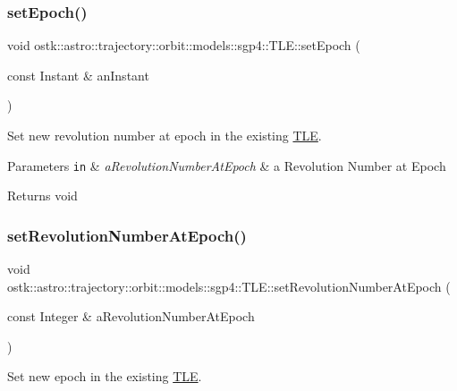 \subsubsection{\texorpdfstring{set\+Epoch()}{setEpoch()}}
{\footnotesize\ttfamily void ostk\+::astro\+::trajectory\+::orbit\+::models\+::sgp4\+::\+T\+L\+E\+::set\+Epoch (\begin{DoxyParamCaption}\item[{const Instant \&}]{an\+Instant }\end{DoxyParamCaption})}



Set new revolution number at epoch in the existing \hyperlink{classostk_1_1astro_1_1trajectory_1_1orbit_1_1models_1_1sgp4_1_1_t_l_e}{T\+LE}. 


\begin{DoxyParams}[1]{Parameters}
\mbox{\tt in}  & {\em a\+Revolution\+Number\+At\+Epoch} & a Revolution Number at Epoch \\
\hline
\end{DoxyParams}
\begin{DoxyReturn}{Returns}
void 
\end{DoxyReturn}
\mbox{\label{classostk_1_1astro_1_1trajectory_1_1orbit_1_1models_1_1sgp4_1_1_t_l_e_a71f0c58af0aac913f7025f7f7e9500d3}} 
\subsubsection{\texorpdfstring{set\+Revolution\+Number\+At\+Epoch()}{setRevolutionNumberAtEpoch()}}
{\footnotesize\ttfamily void ostk\+::astro\+::trajectory\+::orbit\+::models\+::sgp4\+::\+T\+L\+E\+::set\+Revolution\+Number\+At\+Epoch (\begin{DoxyParamCaption}\item[{const Integer \&}]{a\+Revolution\+Number\+At\+Epoch }\end{DoxyParamCaption})}



Set new epoch in the existing \hyperlink{classostk_1_1astro_1_1trajectory_1_1orbit_1_1models_1_1sgp4_1_1_t_l_e}{T\+LE}. 


